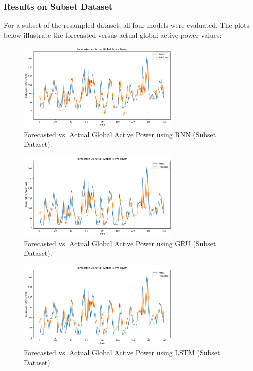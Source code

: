 	\subsubsection{Results on Subset Dataset}
	For a subset of the resampled dataset, all four models were evaluated. The plots below illustrate the forecasted versus actual global active power values:
	
	\begin{figure}[h]
		\centering
		\includegraphics[width=0.7\textwidth]{./figures_aman/path_to_rnn_subset_plot.png}
		\caption{Forecasted vs. Actual Global Active Power using RNN (Subset Dataset).}
		\label{fig:rnn_subset}
	\end{figure}
	
	\begin{figure}[h]
		\centering
		\includegraphics[width=0.7\textwidth]{./figures_aman/path_to_gru_subset_plot.png}
		\caption{Forecasted vs. Actual Global Active Power using GRU (Subset Dataset).}
		\label{fig:gru_subset}
	\end{figure}
	
	\begin{figure}[h]
		\centering
		\includegraphics[width=0.7\textwidth]{./figures_aman/path_to_lstm_subset_plot.png}
		\caption{Forecasted vs. Actual Global Active Power using LSTM (Subset Dataset).}
		\label{fig:lstm_subset}
	\end{figure}
	
